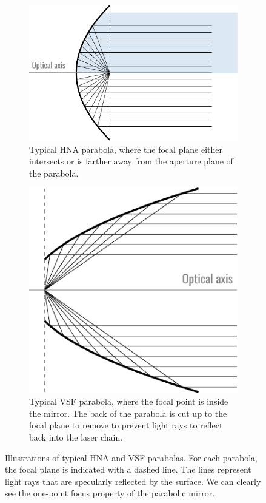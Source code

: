 \documentclass[11pt,SymmetricalJury]{inrsthesis/inrsthesis}
\begin{document}
\begin{figure}
  \begin{subfigure}[t]{0.47\textwidth}
    \centering
    \includegraphics{figs/parabola_hna.pdf}
    \caption{Typical HNA parabola, where the focal plane either intersects or is
            farther away from the aperture plane of the parabola.}
    \label{fig:fwm.vsf-v-hna.hna.geom}
  \end{subfigure}
  \hfill
  \begin{subfigure}[t]{0.47\textwidth}
    \centering
    \includegraphics{figs/parabola_vsf.pdf}
    \caption{Typical VSF parabola, where the focal point is inside the
             mirror. The back of the parabola is cut up to the focal
             plane to remove to prevent light rays to reflect back
             into the laser chain.}
    \label{fig:fwm.vsf-v-hna.vsf.geom}
  \end{subfigure}
  \caption[Illustrations of the typical HNA and VSF parabolas.]
          {Illustrations of typical HNA and VSF parabolas. For each
          parabola, the focal plane is indicated with a dashed line.
          The lines represent light rays that are specularly reflected
          by the surface. We can clearly see the one-point focus property
          of the parabolic mirror.}
  \label{fig:fwm.vsf-v-hna.geom}
\end{figure}
\end{document}
